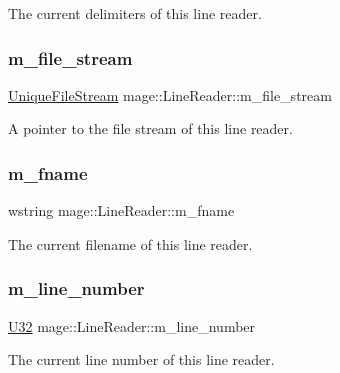 The current delimiters of this line reader. \hypertarget{classmage_1_1_line_reader_a510ff5355c6d26d7c29dc692ef18a3e2}{}\label{classmage_1_1_line_reader_a510ff5355c6d26d7c29dc692ef18a3e2} 
\subsubsection{\texorpdfstring{m\+\_\+file\+\_\+stream}{m\_file\_stream}}
{\footnotesize\ttfamily \hyperlink{namespacemage_a0ee1bd45ad7dbb3dc8c8e1770e3538d4}{Unique\+File\+Stream} mage\+::\+Line\+Reader\+::m\+\_\+file\+\_\+stream\hspace{0.3cm}{\ttfamily [private]}}

A pointer to the file stream of this line reader. \hypertarget{classmage_1_1_line_reader_ad6f55ba12fc610ab2fc1c26a48d12321}{}\label{classmage_1_1_line_reader_ad6f55ba12fc610ab2fc1c26a48d12321} 
\subsubsection{\texorpdfstring{m\+\_\+fname}{m\_fname}}
{\footnotesize\ttfamily wstring mage\+::\+Line\+Reader\+::m\+\_\+fname\hspace{0.3cm}{\ttfamily [private]}}

The current filename of this line reader. \hypertarget{classmage_1_1_line_reader_ab145590a7e115106c0987905fde98393}{}\label{classmage_1_1_line_reader_ab145590a7e115106c0987905fde98393} 
\subsubsection{\texorpdfstring{m\+\_\+line\+\_\+number}{m\_line\_number}}
{\footnotesize\ttfamily \hyperlink{namespacemage_a41c104c036fba3756a74e19f793eeaa1}{U32} mage\+::\+Line\+Reader\+::m\+\_\+line\+\_\+number\hspace{0.3cm}{\ttfamily [private]}}

The current line number of this line reader. 